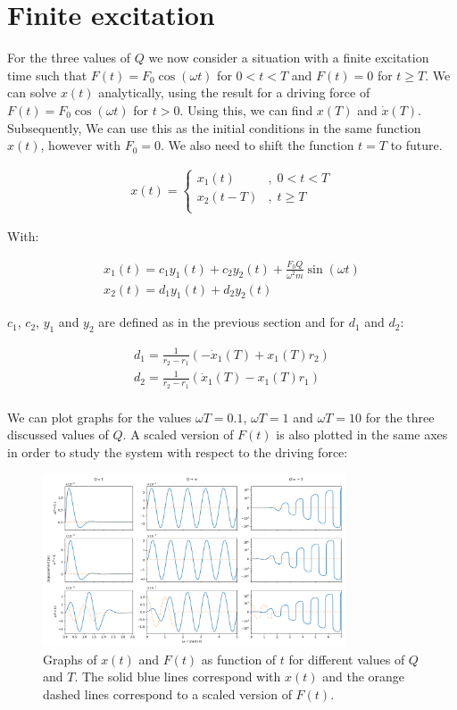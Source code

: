 \section{Finite excitation}

For the three values of $Q$ we now consider a situation with a finite excitation time such that $F(t) = F_0 \cos(\omega t)$ for $0 < t < T$ and $F(t) = 0$ for $t \geq T$. We can solve $x(t)$ analytically, using the result for a driving force of $F(t) = F_0 \cos(\omega t)$ for $t > 0$. Using this, we can find $x(T)$ and $\dot{x}(T)$. Subsequently, We can use this as the initial conditions in the same function $x(t)$, however with $F_0 = 0$. We also need to shift the function $t=T$ to future.

\begin{align*}
	x(t) = \begin{cases}
		x_1(t) & , \; 0 < t < T \\
		x_2(t-T) & , \; t \geq T \\
		\end{cases}
\end{align*}

With:

\begin{align*}
	x_1(t) = c_1 y_1(t) + c_2 y_2(t) + \frac{F_0 Q}{\omega^2 m}\sin(\omega t) \\
	x_2(t) = d_1 y_1(t) + d_2 y_2(t)
\end{align*}

$c_1$, $c_2$, $y_1$ and $y_2$ are defined as in the previous section and for $d_1$ and $d_2$:

\begin{align*}
	d_1 = \frac{1}{r_2-r_1} \left( -\dot{x}_1(T) + x_1(T) r_2 \right) \\
	d_2 = \frac{1}{r_2-r_1} \left( \dot{x}_1(T)  - x_1(T) r_1 \right) \\
\end{align*}

We can plot graphs for the values $\omega T = 0.1$, $\omega T = 1$ and $\omega T = 10$ for the three discussed values of $Q$. A scaled version of $F(t)$ is also plotted in the same axes in order to study the system with respect to the driving force:

\begin{figure}[h!]
	\centering
	\includegraphics[width=0.8\textwidth]{figures/graph_q2.png}
	\caption{Graphs of $x(t)$ and $F(t)$  as function of $t$ for different values of $Q$ and $T$. The solid blue lines correspond with $x(t)$ and the orange dashed lines correspond to a scaled version of $F(t)$.}
	\label{fig_q1}
\end{figure}

